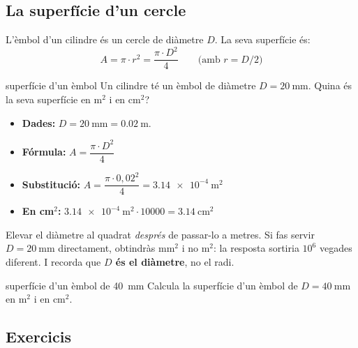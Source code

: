 \subsection*{La superfície d'un cercle}

L'èmbol d'un cilindre és un cercle de diàmetre $D$. La seva superfície és:
\[ A = \pi \cdot r^2 = \frac{\pi \cdot D^2}{4}\qquad\text{(amb } r = D/2\text{)} \]

\begin{exemple}{superfície d'un èmbol}
Un cilindre té un èmbol de diàmetre $D = \SI{20}{\milli\meter}$. Quina és la seva superfície en m$^2$ i en cm$^2$?
\begin{itemize}
 \item \textbf{Dades:} $D = \SI{20}{\milli\meter} = \SI{0,02}{\meter}$.
 \item \textbf{Fórmula:} $A = \dfrac{\pi \cdot D^2}{4}$
 \item \textbf{Substitució:} $A = \dfrac{\pi \cdot 0{,}02^2}{4} = \SI{3,14e-4}{\meter\squared}$
 \item \textbf{En cm$^2$:} $\SI{3,14e-4}{\meter\squared} \cdot 10000 = \SI{3,14}{\centi\meter\squared}$
\end{itemize}
\end{exemple}

\begin{atencio}
Elevar el diàmetre al quadrat \emph{després} de passar-lo a metres. Si fas servir $D = \SI{20}{\milli\meter}$ directament, obtindràs mm$^2$ i no m$^2$: la resposta sortiria $10^6$ vegades diferent. I recorda que \textbf{$D$ és el diàmetre}, no el radi.
\end{atencio}

\begin{guiada}{superfície d'un èmbol de \SI{40}{\milli\meter}}
Calcula la superfície d'un èmbol de $D = \SI{40}{\milli\meter}$ en m$^2$ i en cm$^2$.
\end{guiada}

\subsection*{Exercicis}

